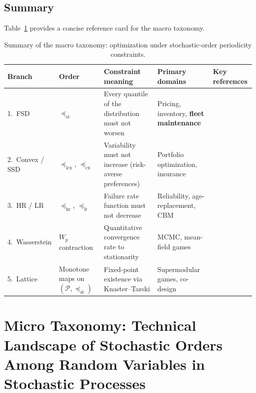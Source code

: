 \documentclass[11pt,a4paper]{article}
\theoremstyle{plain}
\theoremstyle{definition}
\theoremstyle{remark}
\begin{document}
\subsection*{Summary}
\label{sec:macro:summary_text}

Table~\ref{tab:macro_summary} provides a concise reference card for the
macro taxonomy.

\begin{table}[htbp]
\centering
\small
\caption{Summary of the macro taxonomy: optimization under
stochastic-order periodicity constraints.}
\label{tab:macro_summary}
\begin{tabular}{@{} p{2.0cm} p{2.2cm} p{3.0cm} p{2.8cm} p{2.8cm} @{}}
\toprule
\textbf{Branch} & \textbf{Order} & \textbf{Constraint meaning}
  & \textbf{Primary domains} & \textbf{Key references} \\
\midrule
1.\ FSD
  & $\preceq_{\mathrm{st}}$
  & Every quantile of the distribution must not worsen
  & Pricing, inventory, \textbf{fleet maintenance}
  & \cite{lehmann1955,strassen1965,shaked2007} \\[4pt]
2.\ Convex / SSD
  & $\preceq_{\mathrm{icx}}$, $\preceq_{\mathrm{cx}}$
  & Variability must not increase (risk-averse preferences)
  & Portfolio optimization, insurance
  & \cite{dentcheva2003,dentcheva2006,ogryczak1999} \\[4pt]
3.\ HR / LR
  & $\preceq_{\mathrm{hr}}$, $\preceq_{\mathrm{lr}}$
  & Failure rate function must not decrease
  & Reliability, age-replacement, CBM
  & \cite{barlow1996,lai2006,mercier2019} \\[4pt]
4.\ Wasserstein
  & $W_p$ contraction
  & Quantitative convergence rate to stationarity
  & MCMC, mean-field games
  & \cite{villani2009,hairer2011,eberle2016} \\[4pt]
5.\ Lattice
  & Monotone maps on $(\mathcal{P}, \preceq_{\mathrm{st}})$
  & Fixed-point existence via Knaster--Tarski
  & Supermodular games, co-design
  & \cite{topkis1998,milgrom1994,muller2006} \\
\bottomrule
\end{tabular}
\end{table}

\newpage


\section{Micro Taxonomy: Technical Landscape of Stochastic Orders Among Random Variables in Stochastic Processes}
\label{sec:micro}
\end{document}
